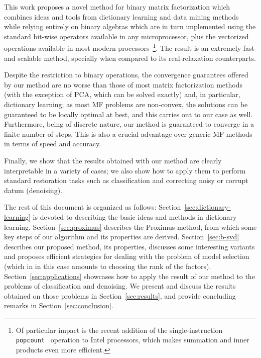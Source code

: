 \documentclass[a4paper]{IEEEtran}
\begin{document}
This work proposes a novel method for binary matrix factorization which combines ideas and tools from dictionary learning and data mining methods while relying entirely on binary algebras which are in turn implemented using the standard bit-wise operators available in any microprocessor, plus the vectorized operations available in most modern processors~\footnote{Of particular impact is the recent addition of the single-instruction \texttt{popcount}~\cite{popcount} operation to Intel processors, which makes summation and inner products even more efficient.}. The result is an extremely fast and scalable method, specially when compared to its real-relaxation counterparts. 

Despite the restriction to binary operations, the convergence guarantees offered by our method are no worse than those of most matrix factorization methods (with the exception of PCA, which can be solved exactly) and, in particular, dictionary learning;  as most MF problems are non-convex, the solutions can be guaranteed to be locally optimal at best, and this carries out to our case as well. Furthermore, being of discrete nature, our method is guaranteed to converge in a finite number of steps. This is also a crucial advantage over generic MF methods in terms of speed and accuracy.


Finally, we show that the results obtained with our method are clearly interpretable in a variety of cases; we also show how to apply them to perform standard restoration tasks such as classification and correcting noisy or corrupt datum (denoising).

The rest of this document is organized as follows: Section~\ref{sec:dictionary-learning} is devoted to describing the basic ideas and methods in dictionary learning. Section~\ref{sec:proximus} describes the Proximus method, from which some key steps of our algorithm and its properties are derived. Section~\ref{sec:b-svd} describes our proposed method, its properties, discusses some interesting variants and proposes efficient strategies for dealing with the problem of model selection (which in in this case amounts to choosing the rank of the factors). Section~\ref{sec:applications} showcases how to apply the result of our method to the problems of classification and denoising.
We present and discuss the results obtained on those problems in Section~\ref{sec:results}, and provide concluding remarks in Section~\ref{sec:conclusion}.
\end{document}
